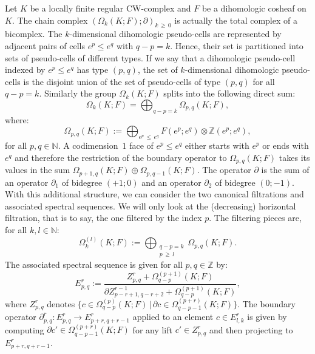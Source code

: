 \documentclass[AHL,Unicode,longabstracts,published]{cedram}
\newcommand{\Z}{\mathbb{Z}}
\newcommand{\N}{\mathbb{N}}
\begin{document}
Let $K$ be a locally finite regular CW-complex and $F$ be a dihomologic cosheaf on~$K$. The chain complex $(\Omega_k(K;F);\partial)_{k\,\geq\,0}$ is actually the total complex of a bicomplex. The $k$-dimensional dihomologic pseudo-cells are represented by adjacent pairs of cells $e^p\leq e^q$ with $q-p=k$. Hence, their set is partitioned into sets of pseudo-cells of different types. If we say that a dihomologic pseudo-cell indexed by $e^p\leq e^q$ has type $(p,q)$, the set of $k$-dimensional dihomologic pseudo-cells is the disjoint union of the set of pseudo-cells of type $(p,q)$ for all $q-p=k$. Similarly the group $\Omega_k(K;F)$ splits into the following direct sum:
\begin{equation*}
\Omega_k(K;F)=\bigoplus_{q-p=k}\Omega_{p,q}(K;F),
\end{equation*}
where:
\begin{equation*}
\Omega_{p,q}(K;F):=\bigoplus_{e^p\,\leq \,e^q}F(e^p;e^q)\otimes\Z(e^p;e^q),
\end{equation*}
for all $p,q\in\N$. A codimension~$1$ face of $e^p\leq e^q$ either starts with $e^p$ or ends with $e^q$ and therefore the restriction of the boundary operator to $\Omega_{p,q}(K;F)$ takes its values in the sum $\Omega_{p+1,q}(K;F)\oplus\Omega_{p,q-1}(K;F)$. The operator $\partial$ is the sum of an operator $\partial_1$ of bidegree $(+1;0)$ and an operator $\partial_2$ of bidegree $(0;-1)$. With this additional structure, we can consider the two canonical filtrations and associated spectral sequences. We will only look at the (decreasing) horizontal filtration, that is to say, the one filtered by the index $p$. The filtering pieces are, for all $k,l\in\N$:
\begin{equation*}
\Omega_k^{(l)}(K;F):=\bigoplus_{\substack{q-p=k\\ p\,\geq\,l}}\Omega_{p,q}(K;F).
\end{equation*}
The associated spectral sequence is given for all $p,q\in\Z$ by:
\begin{equation*}
E^r_{p,q}:=\frac{Z^r_{p,q} + \Omega_{q-p}^{(p+1)}(K;F)}{\partial Z^{r-1}_{p-r+1,q-r+2}+\Omega_{q-p}^{(p+1)}(K;F)},
\end{equation*}
where $Z^r_{p,q}$ denotes $\{c\in \Omega_{q-p}^{(p)}(K;F) \,|\, \partial c \in \Omega_{q-p-1}^{(p+r)}(K;F) \}$. The boundary operator $\partial^r_{p,q}:E^r_{p,q}\rightarrow E^r_{p+r,q+r-1}$ applied to an element $c\in E^r_{l,k}$ is given by computing $\partial c'\in \Omega^{(p+r)}_{q-p-1}(K;F)$ for any lift $c'\in Z^r_{p,q}$ and then projecting to $E^r_{p+r,q+r-1}$.
\end{document}
